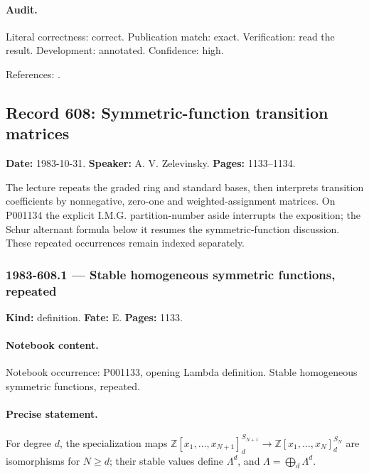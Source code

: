 \paragraph{Audit.} Literal correctness: correct. Publication match: exact. Verification: read the result. Development: annotated. Confidence: high.

\noindent References: \citep{olshanskii1983pairs}.\par

\subsection{Record 608: Symmetric-function transition matrices}

\label{talk:608}

\noindent\textbf{Date:} 1983-10-31. \textbf{Speaker:} A. V. Zelevinsky. \textbf{Pages:} 1133--1134.\par

The lecture repeats the graded ring and standard bases, then interprets transition coefficients by nonnegative, zero-one and weighted-assignment matrices. On P001134 the explicit I.M.G. partition-number aside interrupts the exposition; the Schur alternant formula below it resumes the symmetric-function discussion. These repeated occurrences remain indexed separately.

\subsubsection{1983-608.1 --- Stable homogeneous symmetric functions, repeated}

\label{item:1983-608.1}

\noindent\textbf{Kind:} definition. \textbf{Fate:} E. \textbf{Pages:} 1133.\par

\paragraph{Notebook content.} Notebook occurrence: P001133, opening Lambda definition. Stable homogeneous symmetric functions, repeated.

\paragraph{Precise statement.} For degree \(d\), the specialization maps \(\mathbb Z[x_1,\ldots,x_{N+1}]^{S_{N+1}}_d\to\mathbb Z[x_1,\ldots,x_N]^{S_N}_d\) are isomorphisms for \(N\ge d\); their stable values define \(\Lambda^d\), and \(\Lambda=\bigoplus_d\Lambda^d\).

